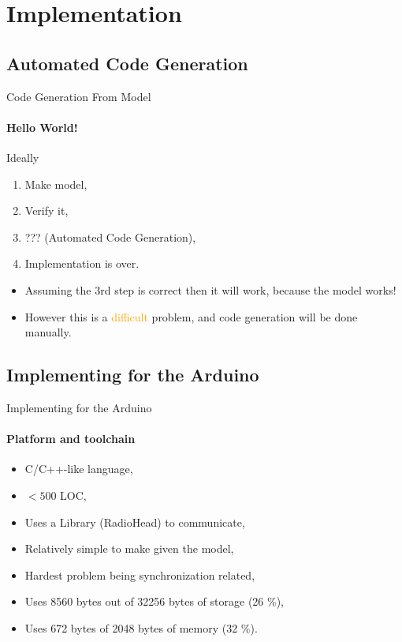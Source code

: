 \section{Implementation}
    \subsection{Automated Code Generation}
    \begin{frame}[t]{Code Generation From Model}\framesubtitle{Hello World!}
        Ideally
        \begin{enumerate}
            \item Make model,
            \item Verify it,
            \item ??? (Automated Code Generation),
            \item Implementation is over.
        \end{enumerate}
        \bigskip
        \begin{itemize}
            \item <2->Assuming the 3rd step is correct then it will work, because the model works!
            \item <3->However this is a \textcolor{orange}{difficult} problem, and code generation will be done manually. 
        \end{itemize}
    \end{frame}
    \subsection{Implementing for the Arduino}
    \begin{frame}[t]{Implementing for the Arduino}\framesubtitle{Platform and toolchain}
        \begin{itemize}
            \item C/C++-like language,
            \item $< 500$ LOC,
            \item Uses a Library (RadioHead) to communicate,
            \item Relatively simple to make given the model,
            \item Hardest problem being synchronization related,
            \item Uses 8560 bytes out of 32256 bytes of storage (26 \%),
            \item Uses 672 bytes of 2048 bytes of memory (32 \%).
        \end{itemize}

    \end{frame}
